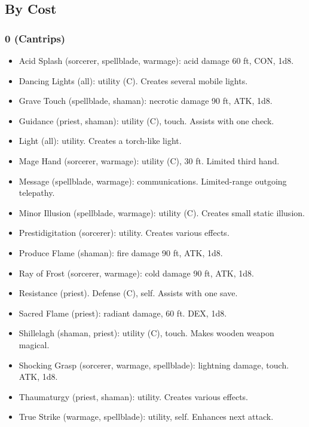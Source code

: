 
\subsection{By Cost}

\subsubsection{0 (Cantrips)}
\begin{itemize}
\item Acid Splash (sorcerer, spellblade, warmage): acid damage 60 ft, CON, 1d8.
\item Dancing Lights (all): utility (C). Creates several mobile lights.
\item Grave Touch (spellblade, shaman): necrotic damage 90 ft, ATK, 1d8.
\item Guidance (priest, shaman): utility (C), touch. Assists with one check.
\item Light (all): utility. Creates a torch-like light.
\item Mage Hand (sorcerer, warmage): utility (C), 30 ft. Limited third hand.
\item Message (spellblade, warmage): communications. Limited-range outgoing telepathy.
\item Minor Illusion (spellblade, warmage): utility (C). Creates small static illusion.
\item Prestidigitation (sorcerer): utility. Creates various effects.
\item Produce Flame (shaman): fire damage 90 ft, ATK, 1d8.
\item Ray of Frost (sorcerer, warmage): cold damage 90 ft, ATK, 1d8.
\item Resistance (priest). Defense (C), self. Assists with one save.
\item Sacred Flame (priest): radiant damage, 60 ft. DEX, 1d8.
\item Shillelagh (shaman, priest): utility (C), touch. Makes wooden weapon magical.
\item Shocking Grasp (sorcerer, warmage, spellblade): lightning damage, touch. ATK, 1d8.
\item Thaumaturgy (priest, shaman): utility. Creates various effects.
\item True Strike (warmage, spellblade): utility, self. Enhances next attack.
\end{itemize}


